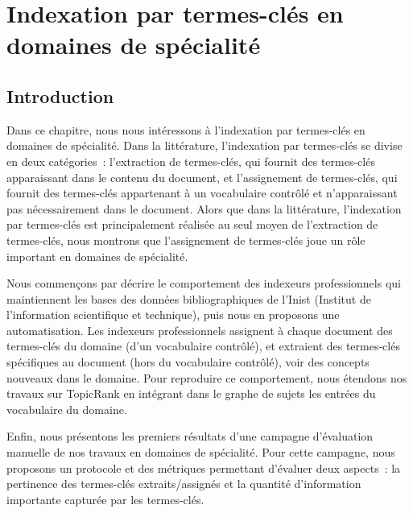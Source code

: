 \chapter{Indexation par termes-clés en domaines de spécialité}
\label{chap:main-domain_specific_keyphrase_annotation}


  \section{Introduction}
  \label{sec:main:domain_specific_keyphrase_annotation-introduction}
    Dans ce chapitre, nous nous intéressons à l'indexation par
    termes-clés en domaines de spécialité. Dans la littérature, l'indexation
    par termes-clés se divise en deux catégories~: l'extraction de termes-clés,
    qui fournit des termes-clés apparaissant dans le contenu du document, et
    l'assignement de termes-clés, qui fournit des termes-clés appartenant à un
    vocabulaire contrôlé et n'apparaissant pas nécessairement dans le document.
    Alors que dans la littérature, l'indexation par termes-clés est
    principalement réalisée au seul moyen de l'extraction de termes-clés, nous
    montrons que l'assignement de termes-clés joue un rôle important en domaines
    de spécialité.

    Nous commençons par décrire le comportement des indexeurs
    professionnels qui maintiennent les bases des données bibliographiques de
    l'Inist (Institut de l'information scientifique et technique), puis nous en
    proposons une automatisation. Les indexeurs professionnels assignent à
    chaque document des termes-clés du domaine (d'un vocabulaire contrôlé), et
    extraient des termes-clés spécifiques au document (hors du vocabulaire
    contrôlé), voir des concepts nouveaux dans le domaine. Pour reproduire ce comportement, nous étendons nos travaux sur
    TopicRank en intégrant dans le graphe de sujets les entrées du vocabulaire
    du domaine.

    Enfin, nous présentons les premiers résultats d'une campagne d'évaluation
    manuelle de nos travaux en domaines de spécialité. Pour cette campagne,
    nous proposons un protocole et des métriques permettant d'évaluer deux
    aspects~: la pertinence des termes-clés extraits/assignés et la quantité
    d'information importante capturée par les termes-clés.

